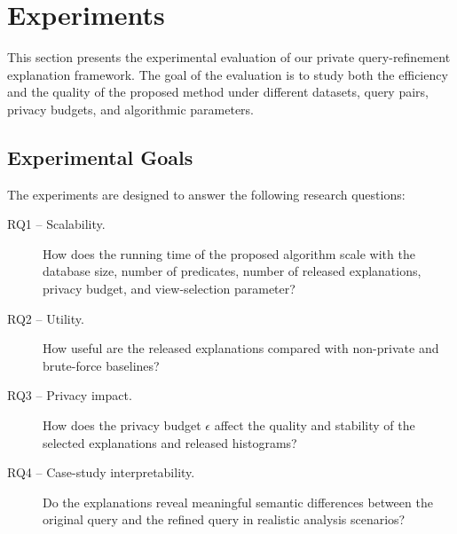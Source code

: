 
\section{Experiments}
\label{sec:experiments}

This section presents the experimental evaluation of our private query-refinement
explanation framework. The goal of the evaluation is to study both the efficiency
and the quality of the proposed method under different datasets, query pairs,
privacy budgets, and algorithmic parameters.

\subsection{Experimental Goals}
\label{subsec:experimental-goals}

The experiments are designed to answer the following research questions:

\begin{description}
    \item[RQ1 -- Scalability.]
    How does the running time of the proposed algorithm scale with the database
    size, number of predicates, number of released explanations, privacy budget,
    and view-selection parameter?

    \item[RQ2 -- Utility.]
    How useful are the released explanations compared with non-private and
    brute-force baselines?

    \item[RQ3 -- Privacy impact.]
    How does the privacy budget $\epsilon$ affect the quality and stability of
    the selected explanations and released histograms?

    \item[RQ4 -- Case-study interpretability.]
    Do the explanations reveal meaningful semantic differences between the
    original query and the refined query in realistic analysis scenarios?
\end{description}

